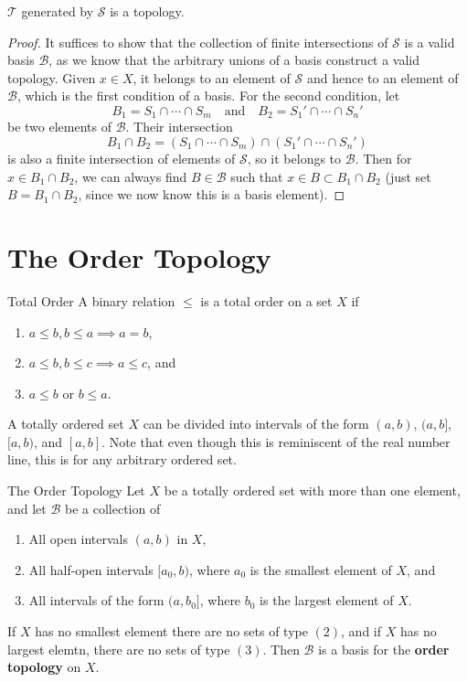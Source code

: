 \documentclass[10pt]{report}
\begin{document}
\begin{prop}
	$\mathcal{T}$ generated by $\mathcal{S}$ is a topology.
\end{prop}
\begin{proof}
	It suffices to show that the collection of finite intersections of $\mathcal{S}$ is a valid basis $\mathcal{B}$, as we know that the arbitrary unions of a basis construct a valid topology. Given $x \in X$, it belongs to an element of $\mathcal{S}$ and hence to an element of $\mathcal{B}$, which is the first condition of a basis. For the second condition, let
	\[
		B_1 = S_1 \cap \cdots \cap S_m \quad \text{and} \quad B_2=S_1' \cap \cdots \cap S_n'
	\]
	be two elements of $\mathcal{B}$. Their intersection
	\[
		B_1 \cap B_2 = (S_1 \cap \cdots \cap S_m) \cap (S_1' \cap \cdots \cap S_n')
	\] 
	is also a finite intersection of elements of $\mathcal{S}$, so it belongs to $\mathcal{B}$. Then for $x \in B_1 \cap B_2$, we can always find $B \in \mathcal{B}$ such that $x \in B \subset B_1 \cap B_2$ (just set $B = B_1 \cap B_2$, since we now know this is a basis element).
\end{proof}


\section{The Order Topology}

\begin{defn}{Total Order}{}
A binary relation $\leq$ is a total order on a set $X$ if
 \begin{enumerate}
	\item $a \leq b, b \leq a \implies a=b$,
	\item $a\leq b, b\leq c \implies a \leq c$, and
	\item $a \leq b$ or $b \leq a$.
\end{enumerate}
\end{defn}

A totally ordered set $X$ can be divided into intervals of the form $(a,b)$, $(a,b]$, $[a,b)$, and $[a,b]$. Note that even though this is reminiscent of the real number line, this is for any arbitrary ordered set.

\begin{defn}{The Order Topology}{}
Let $X$ be a totally ordered set with more than one element, and let $\mathcal{B}$ be a collection of
\begin{enumerate}
	\item All open intervals $(a,b)$ in $X$,
	\item All half-open intervals $[a_0,b)$, where $a_0$ is the smallest element of $X$, and
	\item All intervals of the form $(a,b_0]$, where $b_0$ is the largest element of $X$.
\end{enumerate}
If $X$ has no smallest element there are no sets of type $(2)$, and if $X$ has no largest elemtn, there are no sets of type $(3)$. Then $\mathcal{B}$ is a basis for the \textbf{order topology} on $X$.
\end{defn}
\end{document}
